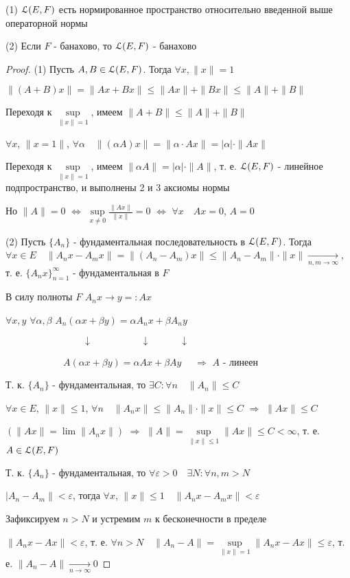 \documentclass[a4paper,12pt]{report}
\begin{document}
\begin{thm} (1) $\EuScript L(E,F)$ есть нормированное пространство относительно введенной выше операторной нормы

(2) Если $F$ - банахово, то $\EuScript L(E,F)$ - банахово
\end{thm}
\begin{proof} (1) Пусть $A,B\in\EuScript L(E,F)$. Тогда $\forall x, \|x\|=1$

$\|(A+B)x\|=\|Ax+Bx\|\le\|Ax\|+\|Bx\|\le\|A\|+\|B\|$

Переходя к $\sup\limits_{\|x\|=1}$, имеем $\|A+B\|\le\|A\|+\|B\|$

$\forall x$, $\|x=1\|$, $\forall\alpha\quad\|(\alpha A)x\|=\|\alpha\cdot Ax\|=|\alpha|\cdot\|Ax\|$

Переходя к $\sup\limits_{\|x\|=1}$, имеем $\|\alpha A\|=|\alpha|\cdot\|A\|$, т. е. $\EuScript L(E,F)$ - линейное подпространство, и выполнены 2 и 3 аксиомы нормы

Но $\|A\|=0$ $\Leftrightarrow$ $\sup\limits_{x\ne0}\frac{\|Ax\|}{\|x\|}=0$ $\Leftrightarrow$ $\forall x\quad Ax=0$, $A=0$

(2) Пусть $\{A_n\}$ - фундаментальная последовательность в $\EuScript L(E,F)$. Тогда $\forall x\in E\quad\|A_n x-A_m x\|=\|(A_n-A_m)x\|\le\|A_n-A_m\|\cdot\|x\|\xrightarrow[n,m\to\infty]{}$, т. е. $\{A_n x\}_{n=1}^\infty$ - фундаментальная в $F$

В силу полноты $F$ $A_n x\to y=:Ax$

$\forall x,y$ $\forall\alpha,\beta$  $A_n(\alpha x+\beta y)=\alpha A_n x+\beta A_n y$

$\quad\quad\quad\quad\quad\quad\quad\quad\downarrow\quad\quad\quad\quad\quad\downarrow\quad\quad\quad\downarrow$

$\quad\quad\quad\quad\quad\quad A(\alpha x+\beta y)=\alpha Ax+\beta Ay$ $\quad\Rightarrow$ $A$ - линеен

Т. к. $\{A_n\}$ - фундаментальная, то $\exists C\colon\forall n\quad\|A_n\|\le C$

$\forall x\in E$, $\|x\|\le1$, $\forall n\quad\|A_n x\|\le\|A_n\|\cdot\|x\|\le C$ $\Rightarrow$ $\|Ax\|\le C$

$(\|Ax\|=\lim\|A_n x\|)$ $\Rightarrow$ $\|A\|=\sup\limits_{\|x\|\le1}\|Ax\|\le C<\infty$, т. е. $A\in\EuScript L(E,F)$

Т. к. $\{A_n\}$ - фундаментальная, то $\forall\varepsilon>0\quad\exists N\colon\forall n,m>N$

$|A_n-A_m\|<\varepsilon$, тогда $\forall x$, $\|x\|\le1\quad\|A_n x-A_m x\|<\varepsilon$

Зафиксируем $n>N$ и устремим $m$ к бесконечности в пределе

 $\|A_n x-Ax\|<\varepsilon$, т. е. $\forall n>N\quad\|A_n-A\|=\sup\limits_{\|x\|=1}\|A_n x-Ax\|\le\varepsilon$, т. е. $\|A_n-A\|\xrightarrow[n\to\infty]{}0$
\end{proof}
 
\end{document}
